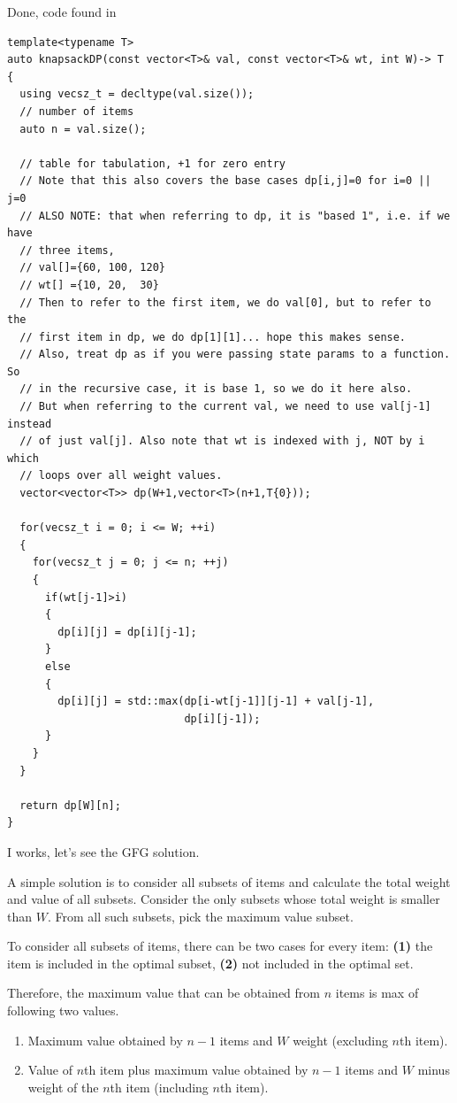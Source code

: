 Done, code found in 
\begin{lstlisting}[style=raycppnewsnippet]
template<typename T>
auto knapsackDP(const vector<T>& val, const vector<T>& wt, int W)-> T
{
  using vecsz_t = decltype(val.size());
  // number of items
  auto n = val.size();

  // table for tabulation, +1 for zero entry
  // Note that this also covers the base cases dp[i,j]=0 for i=0 || j=0
  // ALSO NOTE: that when referring to dp, it is "based 1", i.e. if we have 
  // three items,
  // val[]={60, 100, 120}
  // wt[] ={10, 20,  30}
  // Then to refer to the first item, we do val[0], but to refer to the 
  // first item in dp, we do dp[1][1]... hope this makes sense.
  // Also, treat dp as if you were passing state params to a function. So 
  // in the recursive case, it is base 1, so we do it here also.
  // But when referring to the current val, we need to use val[j-1] instead 
  // of just val[j]. Also note that wt is indexed with j, NOT by i which 
  // loops over all weight values.
  vector<vector<T>> dp(W+1,vector<T>(n+1,T{0}));

  for(vecsz_t i = 0; i <= W; ++i)
  {
    for(vecsz_t j = 0; j <= n; ++j)
    {
      if(wt[j-1]>i)
      {
        dp[i][j] = dp[i][j-1];
      }
      else
      {
        dp[i][j] = std::max(dp[i-wt[j-1]][j-1] + val[j-1],
                            dp[i][j-1]);
      }
    }
  }

  return dp[W][n];
}
\end{lstlisting}
I works, let's see the GFG solution.

\RayNotesEnd

\textbf{}

A simple solution is to consider all subsets of items and calculate the
total weight and value of all subsets. Consider the only subsets whose total
weight is smaller than  $W$. From all such subsets,
pick the maximum value subset.


To consider all subsets of items, there can be two cases for every item:
\textbf{(1)} the item is included in the optimal subset, \textbf{(2)} not
included in the optimal set.

Therefore, the maximum value that can be obtained from $n$ items is max of
following two values.
\begin{enumerate}[label=\textbf{\arabic*.}]
\item Maximum value obtained by $n-1$ items and $W$ weight (excluding $n$th
  item).
\item Value of $n$th item plus maximum value obtained by $n-1$ items and $W$
  minus weight of the $n$th item (including $n$th item).
\end{enumerate}


